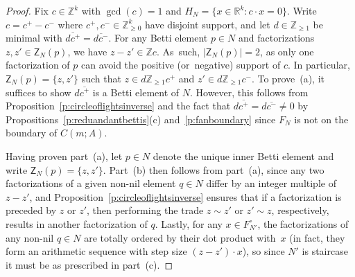 \documentclass[10pt,a4paper]{amsart}
\newcommand\ZZ{\mathbb{Z}}
\newcommand\RR{\mathbb{R}}
\theoremstyle{definition}\newtheorem{defi}[thm]{Definition}
\begin{document}
\begin{proof}
Fix $c \in \ZZ^k$ with $\gcd(c) = 1$ and $H_N = \{x \in \RR^k : c \cdot x = 0\}$.  Write $c = c^+ - c^-$ where $c^+, c^- \in \ZZ_{\ge 0}^k$ have disjoint support, and let $d \in \ZZ_{\ge 1}$ be minimal with $\overline{d c^+} = \overline{d c^-}$.  
For any Betti element $p \in N$ and factorizations $z, z' \in \mathsf Z_N(p)$, we have $z - z' \in \ZZ c$.  As~such, $|\mathsf Z_N(p)| = 2$, as only one factorization of $p$ can avoid the positive (or~negative) support of $c$.  In particular, $\mathsf Z_N(p) = \{z, z'\}$ such that $z \in d \ZZ_{\ge 1} c^+$ and $z' \in d \ZZ_{\ge 1} c^-$.  To prove~(a), it suffices to show $d \overline{c^+}$ is a Betti element of $N$.  However, this follows from Proposition~\ref{p:circleoflightsinverse} and the fact that $d \overline{c^+} = d \overline{c^-} \ne 0$ by Propositions~\ref{p:reduandantbettis}(c) and~\ref{p:fanboundary} since $F_N$ is not on the boundary of $C(m; A)$.  

Having proven part~(a), let $p \in N$ denote the unique inner Betti element and write $\mathsf Z_N(p) = \{z,z'\}$.  Part~(b) then follows from part~(a), since any two factorizations of a given non-nil element $q \in N$ differ by an integer multiple of $z - z'$, and Proposition~\ref{p:circleoflightsinverse} ensures that if a factorization is preceded by $z$ or $z'$, then performing the trade $z \sim z'$ or $z' \sim z$, respectively, results in another factorization of $q$.  Lastly, for any $x \in F_{N'}^\circ$, the factorizations of any non-nil $q \in N$ are totally ordered by their dot product with~$x$ (in fact, they form an arithmetic sequence with step size $(z - z') \cdot x$), so since $N'$ is staircase it must be as prescribed in part~(c).  
\end{proof}
\end{document}

